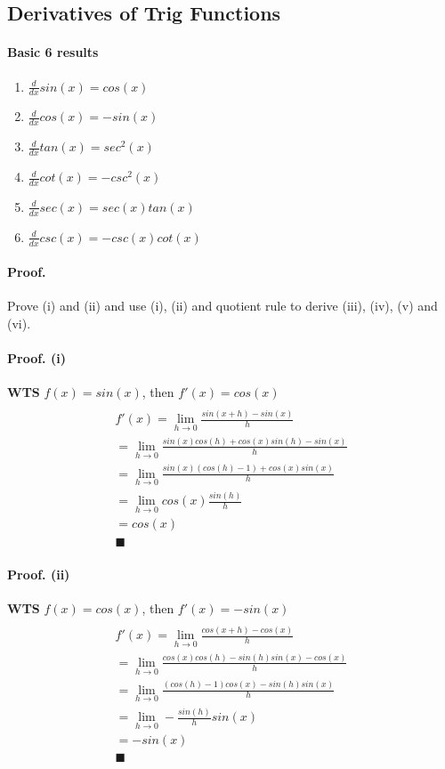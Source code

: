 \documentclass{article}
\begin{document}
	\subsection{Derivatives of Trig Functions}
	\paragraph{Basic 6 results}
	\begin{enumerate}
		\item $\frac{d}{dx} sin(x) = cos(x)$
		\item $\frac{d}{dx} cos(x) = -sin(x)$
		\item $\frac{d}{dx} tan(x) = sec^2(x)$
		\item $\frac{d}{dx} cot(x) = -csc^2(x)$
		\item $\frac{d}{dx} sec(x) = sec(x)tan(x)$
		\item $\frac{d}{dx} csc(x) = -csc(x)cot(x)$
	\end{enumerate}
	\paragraph{Proof.} Prove (i) and (ii) and use (i), (ii) and quotient rule to derive (iii), (iv), (v) and (vi).
	\paragraph{Proof. (i)} \textbf{WTS} $f(x) = sin(x)$, then $f'(x) = cos(x)$
	\begin{multline}
		\\
		f'(x) = \lim_{h \to 0}\frac{sin(x + h) - sin(x)}{h} \\
		= \lim_{h \to 0}\frac{sin(x)cos(h) + cos(x)sin(h) - sin(x)}{h} \\
		= \lim_{h \to 0}\frac{sin(x)(cos(h) - 1) + cos(x)sin(x)}{h} \\
		= \lim_{h \to 0}cos(x)\frac{sin(h)}{h} \\
		= cos(x) \\
		\blacksquare
	\end{multline}
	\paragraph{Proof. (ii)} \textbf{WTS} $f(x) = cos(x)$, then $f'(x) = -sin(x)$
	\begin{multline}
		\\
		f'(x) = \lim_{h \to 0}\frac{cos(x + h) - cos(x)}{h} \\
		= \lim_{h \to 0} \frac{cos(x)cos(h) - sin(h)sin(x) -cos(x)}{h} \\
		= \lim_{h \to 0} \frac{(cos(h) - 1)cos(x) - sin(h)sin(x)}{h} \\
		= \lim_{h \to 0} - \frac{sin(h)}{h}sin(x) \\
		= -sin(x) \\
		\blacksquare
	\end{multline}
\end{document}
